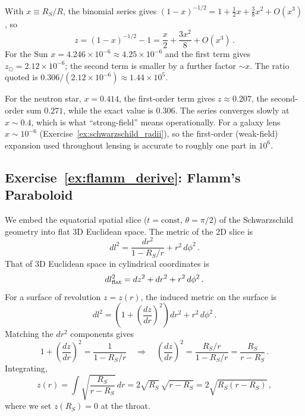 \begin{derivation}
With $x \equiv R_S/R$, the binomial series gives
$(1 - x)^{-1/2} = 1 + \tfrac12 x + \tfrac38 x^2 + O(x^3)$, so
\[
    z = (1 - x)^{-1/2} - 1 = \frac{x}{2} + \frac{3x^2}{8} + O(x^3) \,.
\]
For the Sun $x = 4.246\times10^{-6} \approx 4.25\times10^{-6}$ and the first term gives $z_\odot = 2.12\times10^{-6}$; the
second term is smaller by a further factor $\sim x$. The ratio quoted is
$0.306/(2.12\times10^{-6}) \approx 1.44\times10^{5}$.
\end{derivation}

\begin{annotation}
For the neutron star, $x = 0.414$, the first-order term gives $z \approx 0.207$, the second-order
sum $0.271$, while the exact value is $0.306$. The series converges slowly at $x \sim 0.4$, which
is what ``strong-field'' means operationally. For a galaxy lens $x \sim 10^{-6}$
(Exercise~\ref{ex:schwarzschild_radii}), so the first-order (weak-field) expansion used throughout
lensing is accurate to roughly one part in $10^{6}$.
\end{annotation}

\subsection*{Exercise~\ref{ex:flamm_derive}: Flamm's Paraboloid}

We embed the equatorial spatial slice ($t = \text{const}$, $\theta = \pi/2$) of the
Schwarzschild geometry into flat 3D Euclidean space.
The metric of the 2D slice is
\begin{equation*}
    dl^2 = \frac{dr^2}{1 - R_S/r} + r^2\, d\phi^2 \,.
\end{equation*}
That of 3D Euclidean space in cylindrical coordinates is
\begin{equation*}
    dl^2_{\rm flat} = dz^2 + dr^2 + r^2\, d\phi^2 \,.
\end{equation*}
For a surface of revolution $z = z(r)$, the induced metric on the surface is
\begin{equation*}
    dl^2 = \left(1 + \left(\frac{dz}{dr}\right)^{\!2}\right) dr^2
           + r^2\, d\phi^2 \,.
\end{equation*}
Matching the $dr^2$ components gives
\begin{equation*}
    1 + \left(\frac{dz}{dr}\right)^{\!2} = \frac{1}{1 - R_S/r}
    \quad\Longrightarrow\quad
    \left(\frac{dz}{dr}\right)^{\!2} = \frac{R_S/r}{1 - R_S/r}
    = \frac{R_S}{r - R_S} \,.
\end{equation*}
Integrating,
\begin{equation*}
    z(r) = \int \sqrt{\frac{R_S}{r - R_S}}\, dr
         = 2\sqrt{R_S}\, \sqrt{r - R_S}
         = 2\sqrt{R_S(r - R_S)} \,,
\end{equation*}
where we set $z(R_S) = 0$ at the throat.

